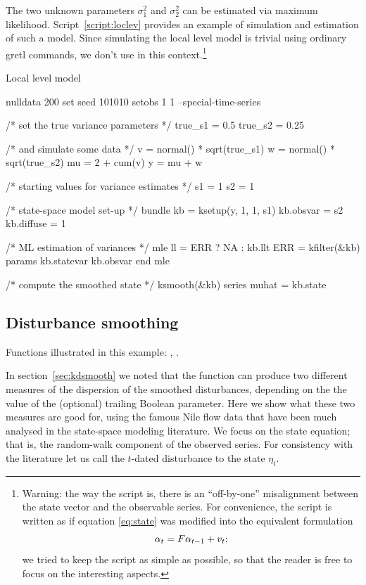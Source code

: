 \documentclass[a4paper]{article}
\begin{document}
The two unknown parameters $\sigma^2_1$ and $\sigma^2_2$ can be
estimated via maximum likelihood.  Script~\ref{script:loclev} provides
an example of simulation and estimation of such a model. Since
simulating the local level model is trivial using ordinary gretl
commands, we don't use  in this context.\footnote{Warning:
  the way the script is, there is an ``off-by-one'' misalignment
  between the state vector and the observable series. For convenience,
  the script is written as if equation \eqref{eq:state} was modified
  into the equivalent formulation
  \[
  \alpha_{t} = F \alpha_{t-1} + v_t ;
  \]
  we tried to keep the script as simple as possible, so that the
  reader is free to focus on the interesting aspects. }

\begin{script}[htbp]
  \caption{Local level model}
  \label{script:loclev}
\begin{scode}
nulldata 200
set seed 101010
setobs 1 1 --special-time-series

/* set the true variance parameters */
true_s1 = 0.5
true_s2 = 0.25

/* and simulate some data */
v = normal() * sqrt(true_s1)
w = normal() * sqrt(true_s2)
mu = 2 + cum(v)
y = mu + w

/* starting values for variance estimates */
s1 = 1
s2 = 1

/* state-space model set-up */
bundle kb = ksetup(y, 1, 1, s1)
kb.obsvar = s2
kb.diffuse = 1

/* ML estimation of variances */
mle ll = ERR ? NA : kb.llt
    ERR = kfilter(&kb)
    params kb.statevar kb.obsvar
end mle

/* compute the smoothed state */
ksmooth(&kb)
series muhat = kb.state
\end{scode}
\end{script}

\subsection{Disturbance smoothing}
\label{sec:example_dsmooth}

Functions illustrated in this example: , .

In section~\ref{sec:kdsmooth} we noted that the 
function can produce two different measures of the dispersion of the
smoothed disturbances, depending on the the value of the (optional)
trailing Boolean parameter. Here we show what these two measures are
good for, using the famous Nile flow data that have been much analysed
in the state-space modeling literature. We focus on the state
equation; that is, the random-walk component of the observed series.
For consistency with the literature let us call the $t$-dated
disturbance to the state $\eta_t$.
\end{document}
